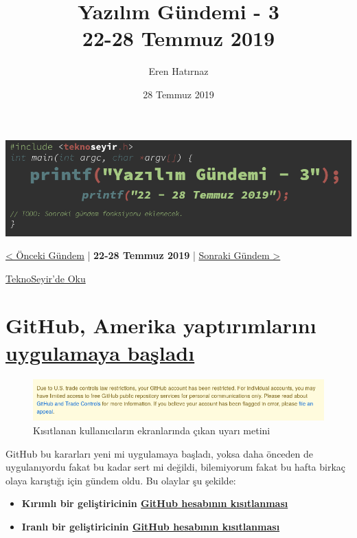 \documentclass[11pt]{article}
\author{Eren Hatırnaz}
\date{28 Temmuz 2019}
\title{Yazılım Gündemi - 3\\\medskip
\large 22-28 Temmuz 2019}
\begin{document}
\maketitle
\tableofcontents \clearpage\shorthandoff{=}

\begin{center}
\includegraphics[width=.9\linewidth]{gorseller/yazilim-gundemi-banner.png}
\end{center}

\begin{center}
\href{../02/yazilim-gundemi-02.pdf}{< Önceki Gündem} | \textbf{22-28 Temmuz 2019} | \href{../04/yazilim-gundemi-04.pdf}{Sonraki Gündem >}

\href{https://teknoseyir.com/blog/yazilim-gundemi-3-22-28-temmuz-2019}{TeknoSeyir'de Oku}
\end{center}

\section{GitHub, Amerika yaptırımlarını \href{https://help.github.com/en/articles/github-and-trade-controls}{uygulamaya başladı}}
\label{sec:orge20967e}
\begin{figure}[htbp]
\centering
\includegraphics[width=.9\linewidth]{gorseller/github-amerika-yaptirimlari-1.png}
\caption{Kısıtlanan kullanıcıların ekranlarında çıkan uyarı metini}
\end{figure}

GitHub bu kararları yeni mi uygulamaya başladı, yoksa daha önceden de
uygulanıyordu fakat bu kadar sert mi değildi, bilemiyorum fakat bu hafta
birkaç olaya karıştığı için gündem oldu. Bu olaylar şu şekilde:

\begin{itemize}
\item \textbf{Kırımlı bir geliştiricinin \href{https://github.com/tkashkin/GameHub/issues/289}{GitHub hesabının kısıtlanması}}
\item \textbf{Iranlı bir geliştiricinin \href{https://medium.com/hamed/github-blocked-my-account-and-they-think-im-developing-nuclear-weapons-e7e1fe62cb74}{GitHub hesabının kısıtlanması}}
\end{itemize}
\end{document}
